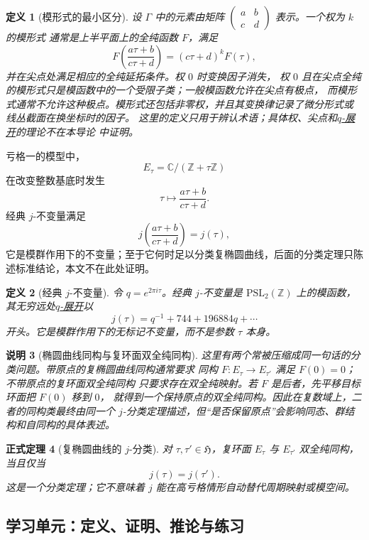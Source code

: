 \documentclass[UTF8,fontset=none,a4paper,11pt]{ctexart}
\theoremstyle{foundation-definition}
\newtheorem{definition}{定义}[section]
\theoremstyle{foundation-theorem}
\newtheorem{theorem}[definition]{正式定理}
\theoremstyle{foundation-proposition}
\theoremstyle{foundation-example}
\theoremstyle{foundation-remark}
\newtheorem{remark}[definition]{说明}
\theoremstyle{foundation-theorem}
\newcommand{\C}{\mathbb C}
\newcommand{\Z}{\mathbb Z}
\newcommand{\term}[2]{\hyperref[#1]{#2}}
\begin{document}
\begin{definition}[模形式的最小区分]\label{def:modular-form}
设 \(\Gamma\) 中的元素由矩阵
\(\begin{pmatrix}a&b\\c&d\end{pmatrix}\) 表示。一个权为 \(k\) 的模形式
通常是上半平面上的全纯函数 \(F\)，满足
\[
F\!\left(\frac{a\tau+b}{c\tau+d}\right)
=(c\tau+d)^kF(\tau),
\]
并在尖点处满足相应的全纯延拓条件。权 \(0\) 时变换因子消失，
权 \(0\) 且在尖点全纯的模形式只是模函数中的一个受限子类；一般模函数允许在尖点有极点，
而模形式通常不允许这种极点。模形式还包括非零权，并且其变换律记录了微分形式或
线丛截面在换坐标时的因子。
这里的定义只用于辨认术语；具体权、尖点和\term{def:q-expansion}{\(q\)-展开}的理论不在本导论
中证明。
\end{definition}

亏格一的模型中，
\[
E_\tau=\C/(\Z+\tau\Z)
\]
在改变整数基底时发生
\[
\tau\longmapsto\frac{a\tau+b}{c\tau+d}.
\]
经典 \(j\)-不变量满足
\[
j\left(\frac{a\tau+b}{c\tau+d}\right)=j(\tau),
\]
它是模群作用下的不变量；至于它何时足以分类复椭圆曲线，后面的分类定理只陈述标准结论，本文不在此处证明。

\begin{definition}[经典 \(j\)-不变量]\label{def:j-invariant}
令 \(q=e^{2\pi i\tau}\)。经典 \(j\)-不变量是 \(\mathrm{PSL}_2(\mathbb Z)\) 上的模函数，其无穷远处\term{def:q-expansion}{\(q\)-展开}以
\[
j(\tau)=q^{-1}+744+196884q+\cdots
\]
开头。它是模群作用下的无标记不变量，而不是参数 \(\tau\) 本身。
\end{definition}

\begin{remark}[椭圆曲线同构与复环面双全纯同构]
这里有两个常被压缩成同一句话的分类问题。带原点的复椭圆曲线同构通常要求
同构 \(F:E_\tau\to E_{\tau'}\) 满足 \(F(0)=0\)；不带原点的复环面双全纯同构
只要求存在双全纯映射。若 \(F\) 是后者，先平移目标环面把 \(F(0)\) 移到 \(0\)，
就得到一个保持原点的双全纯同构。因此在复数域上，二者的同构类最终由同一个
\(j\)-分类定理描述，但“是否保留原点”会影响同态、群结构和自同构的具体表述。
\end{remark}

\begin{theorem}[复椭圆曲线的 \(j\)-分类]
对 \(\tau,\tau'\in\mathfrak H\)，复环面 \(E_\tau\) 与 \(E_{\tau'}\) 双全纯同构，当且仅当
\[
j(\tau)=j(\tau').
\]
这是一个分类定理；它不意味着 \(j\) 能在高亏格情形自动替代周期映射或模空间。
\end{theorem}

\subsection{学习单元：定义、证明、推论与练习}
\end{document}
